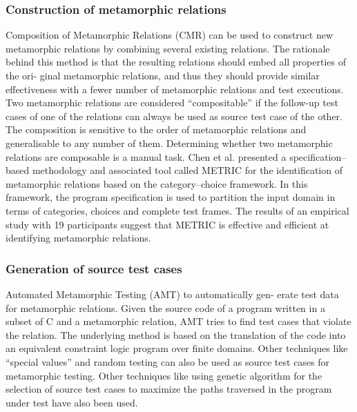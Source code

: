 		\subsubsection{Construction of metamorphic relations}
		Composition of Metamorphic Relations (CMR) can be used to construct new metamorphic relations by combining several existing relations. The rationale behind this method is that the resulting relations should embed all properties of the ori- ginal metamorphic relations, and thus they should provide similar effectiveness with a fewer number of metamorphic relations and test executions. Two metamorphic relations are considered “compositable” if the follow-up test cases of one of the relations can always be used as source test case of the other. The composition is sensitive to the order of metamorphic relations and generalisable to any number of them. Determining whether two metamorphic relations are composable is a manual task. Chen et al. \cite{} presented a specification–based methodology and associated tool called METRIC for the identification of metamorphic relations based on the category–choice framework. In this framework, the program specification is used to partition the input domain in terms of categories, choices and complete test frames. The results of an empirical study with 19 participants suggest that METRIC is effective and efficient at identifying metamorphic relations.
		\subsubsection{Generation of source test cases}
		Automated Metamorphic Testing (AMT) to automatically gen- erate test data for metamorphic relations. Given the source code of a program written in a subset of C and a metamorphic relation, AMT tries to find test cases that violate the relation. The underlying method is based on the translation of the code into an equivalent constraint logic program over finite domains. Other techniques like “special values” and random testing can also be used as source test cases for metamorphic testing. Other techniques like using genetic algorithm for the selection of source test cases to maximize the paths traversed in the program under test have also been used.
